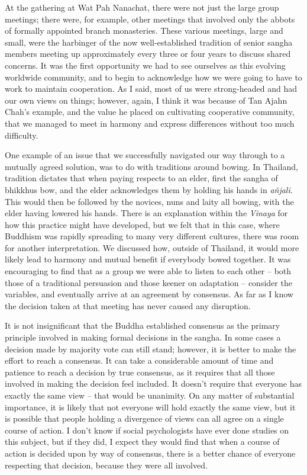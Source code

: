 At the gathering at Wat Pah Nanachat, there were not just the large
group meetings; there were, for example, other meetings that involved
only the abbots of formally appointed branch monasteries. These various
meetings, large and small, were the harbinger of the now
well-established tradition of senior sangha members meeting up
approximately every three or four years to discuss shared concerns. It
was the first opportunity we had to see ourselves as this evolving
worldwide community, and to begin to acknowledge how we were going to
have to work to maintain cooperation. As I said, most of us were
strong-headed and had our own views on things; however, again, I think
it was because of Tan Ajahn Chah's example, and the value he placed on
cultivating cooperative community, that we managed to meet in harmony
and express differences without too much difficulty.

One example of an issue that we successfully navigated our way through
to a mutually agreed solution, was to do with traditions around bowing.
In Thailand, tradition dictates that when paying respects to an elder,
first the sangha of bhikkhus bow, and the elder acknowledges them by
holding his hands in \emph{añjali}. This would then be followed by the
novices, nuns and laity all bowing, with the elder having lowered his
hands. There is an explanation within the \emph{Vinaya} for how this
practice might have developed, but we felt that in this case, where
Buddhism was rapidly spreading to many very different cultures, there
was room for another interpretation. We discussed how, outside of
Thailand, it would more likely lead to harmony and mutual benefit if
everybody bowed together. It was encouraging to find that as a group we
were able to listen to each other -- both those of a traditional
persuasion and those keener on adaptation -- consider the variables, and
eventually arrive at an agreement by consensus. As far as I know the
decision taken at that meeting has never caused any disruption.

It is not insignificant that the Buddha established consensus as the
primary principle involved in making formal decisions in the sangha. In
some cases a decision made by majority vote can still stand; however, it
is better to make the effort to reach a consensus. It can take a
considerable amount of time and patience to reach a decision by true
consensus, as it requires that all those involved in making the decision
feel included. It doesn't require that everyone has exactly the same
view -- that would be unanimity. On any matter of substantial
importance, it is likely that not everyone will hold exactly the same
view, but it is possible that people holding a divergence of views can
all agree on a single course of action. I don't know if social
psychologists have ever done studies on this subject, but if they did, I
expect they would find that when a course of action is decided upon by
way of consensus, there is a better chance of everyone respecting that
decision, because they were all involved.

